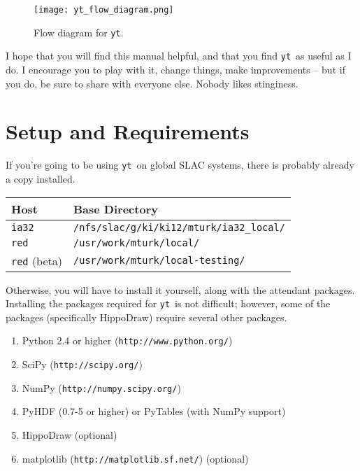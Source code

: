\documentclass{article}
\newcommand{\yt}{\texttt{yt}}
\newcommand{\hd}{HippoDraw}
\begin{document}
\begin{centering}
\begin{figure}[tbh!]
\texttt{[image: yt\_flow\_diagram.png]}
\caption{\label{yt_flow}Flow diagram for \yt.}
\end{figure}
\end{centering}

I hope that you will find this manual helpful, and that you find \yt\ as useful as
I do.  I encourage you to play with it, change things, make improvements -- but if
you do, be sure to share with everyone else.  Nobody likes stinginess.

\clearpage
\section{Setup and Requirements}

If you're going to be using \yt\ on global SLAC systems, there is probably already
a copy installed.

\vspace{0.25in}
\begin{tabular}{ll}
Host & Base Directory \\ \hline
\texttt{ia32} & \texttt{/nfs/slac/g/ki/ki12/mturk/ia32\_local/} \\
\texttt{red} & \texttt{/usr/work/mturk/local/} \\
\texttt{red} (beta) & \texttt{/usr/work/mturk/local-testing/}
\end{tabular}
\vspace{0.25in}

Otherwise, you will have to install it yourself, along with the attendant packages.
Installing the packages required for \yt\ is not difficult; however, some of the
packages (specifically \hd) require several other packages.

\begin{enumerate}
\item Python 2.4 or higher (\texttt{http://www.python.org/})
\item SciPy (\texttt{http://scipy.org/})
\item NumPy (\texttt{http://numpy.scipy.org/})
\item PyHDF (0.7-5 or higher) or PyTables (with NumPy support)
\item HippoDraw (optional)
\item matplotlib (\texttt{http://matplotlib.sf.net/}) (optional)
\end{enumerate}
\end{document}
